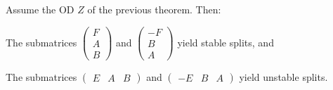\documentclass[../../../main]{subfiles}
\begin{document}
 \begin{thm}
  Assume the OD $Z$ of the previous theorem. Then:
  \begin{defenum}
   \item\label{stable-split} The submatrices $\left(\begin{smallmatrix} F \\ A \\ B \end{smallmatrix}\right)$ and $\left(\begin{smallmatrix} -F \\ B \\ A \end{smallmatrix}\right)$ yield stable splits, and
   
   \item\label{unstable-split} The submatrices $\left(\begin{smallmatrix} E&A&B \end{smallmatrix}\right)$ and $\left(\begin{smallmatrix} -E&B&A \end{smallmatrix}\right)$ yield unstable splits.
  \end{defenum}
 \end{thm}
 
\end{document}
